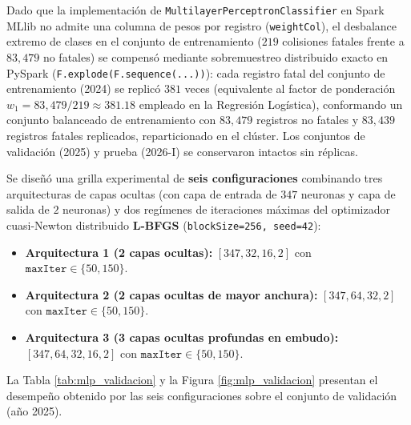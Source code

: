 Dado que la implementación de \texttt{MultilayerPerceptronClassifier} en Spark MLlib no admite una columna de pesos por registro (\texttt{weightCol}), el desbalance extremo de clases en el conjunto de entrenamiento ($219$ colisiones fatales frente a $83,479$ no fatales) se compensó mediante sobremuestreo distribuido exacto en PySpark (\texttt{F.explode(F.sequence(...))}): cada registro fatal del conjunto de entrenamiento (2024) se replicó $381$ veces (equivalente al factor de ponderación $w_1 = 83{,}479 / 219 \approx 381.18$ empleado en la Regresión Logística), conformando un conjunto balanceado de entrenamiento con $83,479$ registros no fatales y $83,439$ registros fatales replicados, reparticionado en el clúster. Los conjuntos de validación (2025) y prueba (2026-I) se conservaron intactos sin réplicas.

Se diseñó una grilla experimental de \textbf{seis configuraciones} combinando tres arquitecturas de capas ocultas (con capa de entrada de $347$ neuronas y capa de salida de $2$ neuronas) y dos regímenes de iteraciones máximas del optimizador cuasi-Newton distribuido \textbf{L-BFGS} (\texttt{blockSize=256, seed=42}):
\begin{itemize}
    \item \textbf{Arquitectura 1 (2 capas ocultas):} $[347, 32, 16, 2]$ con $\texttt{maxIter} \in \{50, 150\}$.
    \item \textbf{Arquitectura 2 (2 capas ocultas de mayor anchura):} $[347, 64, 32, 2]$ con $\texttt{maxIter} \in \{50, 150\}$.
    \item \textbf{Arquitectura 3 (3 capas ocultas profundas en embudo):} $[347, 64, 32, 16, 2]$ con $\texttt{maxIter} \in \{50, 150\}$.
\end{itemize}

La Tabla \ref{tab:mlp_validacion} y la Figura \ref{fig:mlp_validacion} presentan el desempeño obtenido por las seis configuraciones sobre el conjunto de validación (año 2025).

